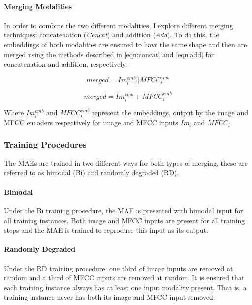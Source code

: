 \paragraph{Merging Modalities}
In order to combine the two different modalities, I explore different merging techniques: concatenation (\textit{Concat}) and addition (\textit{Add}). To do this, the embeddings of both modalities are ensured to have the same shape and then are merged using the methods described in \autoref{eqn:concat} and \autoref{eqn:add} for concatenation and addition, respectively. %

 \begin{equation}\label{eqn:concat}
 	merged = Im_i^{emb} || MFCC_i^{emb} 	
 \end{equation}

 \begin{equation}\label{eqn:add}  
 	merged = Im_i^{emb} + MFCC_i^{emb} 	
 \end{equation}
 

Where $Im_i^{emb}$ and $MFCC_i^{emb}$ represent the embeddings, output by the image and MFCC encoders respectively for image and MFCC inputs $Im_i$ and $MFCC_i$.

\subsubsection{Training Procedures}

The MAEs are trained in two different ways for both types of merging, these are referred to as bimodal (Bi) and randomly degraded (RD).

\paragraph{Bimodal}
Under the Bi training procedure, the MAE is presented with bimodal input for all training instances. Both image and MFCC inputs are present for all training steps and the MAE is trained to reproduce this input as its output.

\paragraph{Randomly Degraded}
Under the RD training procedure, one third of image inputs are removed at random and a third of MFCC inputs are removed at random. It is ensured that each training instance always has at least one input modality present. That is, a training instance never has both its image and MFCC input removed. 

